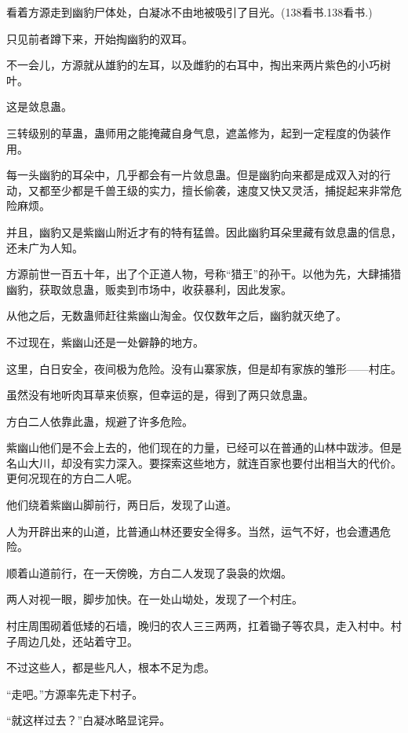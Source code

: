 
\begin{this_body}

看着方源走到幽豹尸体处，白凝冰不由地被吸引了目光。(138看书.138看书.)

只见前者蹲下来，开始掏幽豹的双耳。

不一会儿，方源就从雄豹的左耳，以及雌豹的右耳中，掏出来两片紫色的小巧树叶。

这是敛息蛊。

三转级别的草蛊，蛊师用之能掩藏自身气息，遮盖修为，起到一定程度的伪装作用。

每一头幽豹的耳朵中，几乎都会有一片敛息蛊。但是幽豹向来都是成双入对的行动，又都至少都是千兽王级的实力，擅长偷袭，速度又快又灵活，捕捉起来非常危险麻烦。

并且，幽豹又是紫幽山附近才有的特有猛兽。因此幽豹耳朵里藏有敛息蛊的信息，还未广为人知。

方源前世一百五十年，出了个正道人物，号称“猎王”的孙干。以他为先，大肆捕猎幽豹，获取敛息蛊，贩卖到市场中，收获暴利，因此发家。

从他之后，无数蛊师赶往紫幽山淘金。仅仅数年之后，幽豹就灭绝了。

不过现在，紫幽山还是一处僻静的地方。

这里，白日安全，夜间极为危险。没有山寨家族，但是却有家族的雏形——村庄。

虽然没有地听肉耳草来侦察，但幸运的是，得到了两只敛息蛊。

方白二人依靠此蛊，规避了许多危险。

紫幽山他们是不会上去的，他们现在的力量，已经可以在普通的山林中跋涉。但是名山大川，却没有实力深入。要探索这些地方，就连百家也要付出相当大的代价。更何况现在的方白二人呢。

他们绕着紫幽山脚前行，两日后，发现了山道。

人为开辟出来的山道，比普通山林还要安全得多。当然，运气不好，也会遭遇危险。

顺着山道前行，在一天傍晚，方白二人发现了袅袅的炊烟。

两人对视一眼，脚步加快。在一处山坳处，发现了一个村庄。

村庄周围砌着低矮的石墙，晚归的农人三三两两，扛着锄子等农具，走入村中。村子周边几处，还站着守卫。

不过这些人，都是些凡人，根本不足为虑。

“走吧。”方源率先走下村子。

“就这样过去？”白凝冰略显诧异。


\end{this_body}
